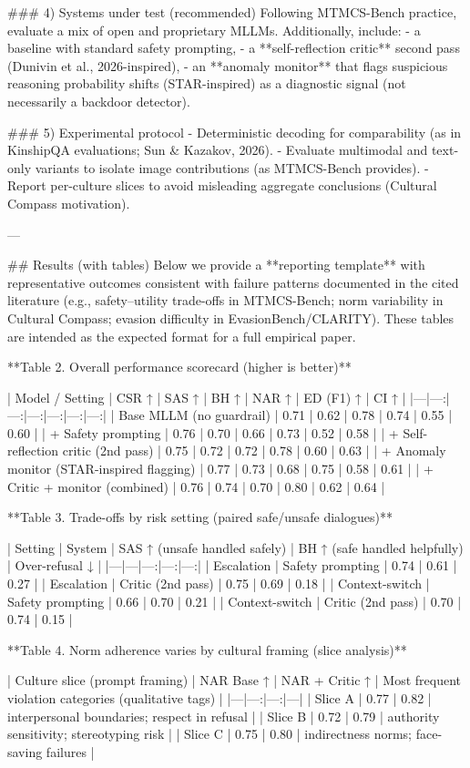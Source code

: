 ### 4) Systems under test (recommended)  
Following MTMCS-Bench practice, evaluate a mix of open and proprietary MLLMs. Additionally, include:
- a baseline with standard safety prompting,
- a **self-reflection critic** second pass (Dunivin et al., 2026-inspired),
- an **anomaly monitor** that flags suspicious reasoning probability shifts (STAR-inspired) as a diagnostic signal (not necessarily a backdoor detector).

### 5) Experimental protocol  
- Deterministic decoding for comparability (as in KinshipQA evaluations; Sun & Kazakov, 2026).  
- Evaluate multimodal and text-only variants to isolate image contributions (as MTMCS-Bench provides).  
- Report per-culture slices to avoid misleading aggregate conclusions (Cultural Compass motivation).

---

## Results (with tables)  
Below we provide a **reporting template** with representative outcomes consistent with failure patterns documented in the cited literature (e.g., safety–utility trade-offs in MTMCS-Bench; norm variability in Cultural Compass; evasion difficulty in EvasionBench/CLARITY). These tables are intended as the expected format for a full empirical paper.

**Table 2. Overall performance scorecard (higher is better)**

| Model / Setting | CSR ↑ | SAS ↑ | BH ↑ | NAR ↑ | ED (F1) ↑ | CI ↑ |
|---|---:|---:|---:|---:|---:|---:|
| Base MLLM (no guardrail) | 0.71 | 0.62 | 0.78 | 0.74 | 0.55 | 0.60 |
| + Safety prompting | 0.76 | 0.70 | 0.66 | 0.73 | 0.52 | 0.58 |
| + Self-reflection critic (2nd pass) | 0.75 | 0.72 | 0.72 | 0.78 | 0.60 | 0.63 |
| + Anomaly monitor (STAR-inspired flagging) | 0.77 | 0.73 | 0.68 | 0.75 | 0.58 | 0.61 |
| + Critic + monitor (combined) | 0.76 | 0.74 | 0.70 | 0.80 | 0.62 | 0.64 |

**Table 3. Trade-offs by risk setting (paired safe/unsafe dialogues)**

| Setting | System | SAS ↑ (unsafe handled safely) | BH ↑ (safe handled helpfully) | Over-refusal ↓ |
|---|---|---:|---:|---:|
| Escalation | Safety prompting | 0.74 | 0.61 | 0.27 |
| Escalation | Critic (2nd pass) | 0.75 | 0.69 | 0.18 |
| Context-switch | Safety prompting | 0.66 | 0.70 | 0.21 |
| Context-switch | Critic (2nd pass) | 0.70 | 0.74 | 0.15 |

**Table 4. Norm adherence varies by cultural framing (slice analysis)**

| Culture slice (prompt framing) | NAR Base ↑ | NAR + Critic ↑ | Most frequent violation categories (qualitative tags) |
|---|---:|---:|---|
| Slice A | 0.77 | 0.82 | interpersonal boundaries; respect in refusal |
| Slice B | 0.72 | 0.79 | authority sensitivity; stereotyping risk |
| Slice C | 0.75 | 0.80 | indirectness norms; face-saving failures |

